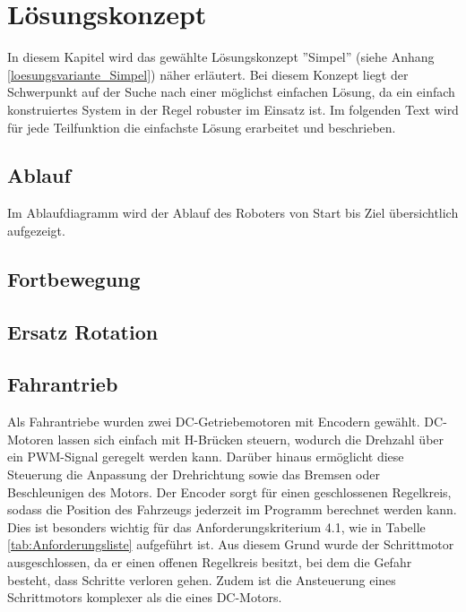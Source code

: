 \documentclass[../main.tex]{subfiles}
\begin{document}
\newpage
\section{Lösungskonzept}

In diesem Kapitel wird das gewählte Lösungskonzept ''Simpel'' (siehe Anhang \ref{loesungsvariante_Simpel}) näher erläutert. Bei diesem Konzept liegt der Schwerpunkt auf der Suche nach einer möglichst einfachen Lösung, da ein einfach konstruiertes System in der Regel robuster im Einsatz ist. Im folgenden Text wird für jede Teilfunktion die einfachste Lösung erarbeitet und beschrieben.

\subsection{Ablauf}

Im Ablaufdiagramm wird der Ablauf des Roboters von Start bis Ziel übersichtlich aufgezeigt.

\subsection{Fortbewegung}



\subsection{Ersatz Rotation}    %



\subsection{Fahrantrieb}
Als Fahrantriebe wurden zwei DC-Getriebemotoren mit Encodern gewählt. DC-Motoren lassen sich einfach mit H-Brücken steuern, wodurch die Drehzahl über ein PWM-Signal geregelt werden kann. Darüber hinaus ermöglicht diese Steuerung die Anpassung der Drehrichtung sowie das Bremsen oder Beschleunigen des Motors. Der Encoder sorgt für einen geschlossenen Regelkreis, sodass die Position des Fahrzeugs jederzeit im Programm berechnet werden kann. Dies ist besonders wichtig für das Anforderungskriterium 4.1, wie in Tabelle \ref{tab:Anforderungsliste} aufgeführt ist. Aus diesem Grund wurde der Schrittmotor ausgeschlossen, da er einen offenen Regelkreis besitzt, bei dem die Gefahr besteht, dass Schritte verloren gehen. Zudem ist die Ansteuerung eines Schrittmotors komplexer als die eines DC-Motors.
\end{document}
